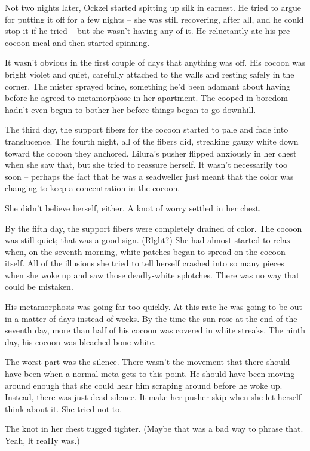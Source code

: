 \documentclass[a1paper]{article}
\begin{document}
\begin{multicols}{7}
{Not two nights later, Ockzel started spitting up silk in earnest.  He tried to argue for putting it off for a few nights – she was still recovering, after all, and he could stop it if he tried – but she wasn't having any of it.  He reluctantly ate his pre-cocoon meal and then started spinning.

It wasn't obvious in the first couple of days that anything was off.  His cocoon was bright violet and quiet, carefully attached to the walls and resting safely in the corner.  The mister sprayed brine, something he'd been adamant about having before he agreed to metamorphose in her apartment.  The cooped-in boredom hadn't even begun to bother her before things began to go downhill.

The third day, the support fibers for the cocoon started to pale and fade into translucence.  The fourth night, all of the fibers did, streaking gauzy white down toward the cocoon they anchored.  Lilura's pusher flipped anxiously in her chest when she saw that, but she tried to reassure herself.  It wasn't necessarily too soon – perhaps the fact that he was a seadweller just meant that the color was changing to keep a concentration in the cocoon.

She didn't believe herself, either.  A knot of worry settled in her chest.

By the fifth day, the support fibers were completely drained of color.  The cocoon was still quiet; that was a good sign.  (Rlght?)  She had almost started to relax when, on the seventh morning, white patches began to spread on the cocoon itself.  All of the illusions she tried to tell herself crashed into so many pieces when she woke up and saw those deadly-white splotches.  There was no way that could be mistaken.

His metamorphosis was going far too quickly.  At this rate he was going to be out in a matter of days instead of weeks.  By the time the sun rose at the end of the seventh day, more than half of his cocoon was covered in white streaks.  The ninth day, his cocoon was bleached bone-white.

The worst part was the silence.  There wasn't the movement that there should have been when a normal meta gets to this point.  He should have been moving around enough that she could hear him scraping around before he woke up.  Instead, there was just dead silence.  It make her pusher skip when she let herself think about it.  She tried not to.

The knot in her chest tugged tighter.  (Maybe that was a bad way to phrase that.  Yeah, lt reaIIy was.)

}
\end{multicols}
\end{document}
